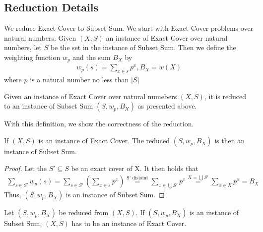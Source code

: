 \subsection{Reduction Details}
We reduce Exact Cover to Subset Sum. We start with Exact Cover problems over natural numbers. 
Given $(X, S)$ an instance of Exact Cover over natural numbers, let $S$ be the set in the instance of Subset Sum. Then we
define the weighting function $w_{p}$ and the sum $B_{X}$ by 
\begin{align*}
    w_p(s) = \sum_{x \in s} p^x , B_X = w(X)
\end{align*}
where $p$ is a natural number no less than $|S|$
\begin{definition}[Reduction XC to SS]
    Given an instance of Exact Cover over natural numebers $(X, S)$, 
    it is reduced to an instance of Subset Sum $(S, w_p, B_X)$ as presented above.
\end{definition}
With this definition, we show the correctness of the reduction.
\begin{lemma}[Soundness]
    If $(X, S)$ is an instance of Exact Cover. The reduced $(S, w_p, B_X)$ is then an instance of Subset Sum. 
\end{lemma}
\begin{proof}
    Let the $S' \subseteq S$ be an exact cover of X. It then holds that
\begin{align*}
    \sum_{s \in S'} w_p(s) = \sum_{s \in S'} (\sum_{x \in s} p^x) 
    \stackrel{\text{S' disjoint}}{=} \sum_{x \in \bigcup S'} p^x 
    \stackrel{X = \bigcup S'}{=} \sum_{x \in X} p^x = B_X
\end{align*}
Thus, $(S, w_p, B_X)$ is an instance of Subset Sum. 
\end{proof}
\begin{lemma}[Completeness]
    Let $(S, w_p, B_X)$ be reduced from $(X, S)$. If $(S, w_p, B_X)$ is an instance of Subset Sum, 
    $(X, S)$ has to be an instance of Exact Cover. 
\end{lemma}
